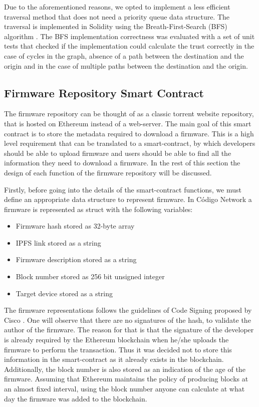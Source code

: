 {{{Due to the aforementioned reasons, we opted to implement a less efficient traversal method that does not need a priority queue data structure. The traversal is implemented in Solidity using the Breath-First-Search (BFS) algorithm \cite{algos}. The BFS implementation correctness was evaluated with a set of unit tests that checked if the implementation could calculate the trust correctly in the case of cycles in the graph, absence of a path between the destination and the origin and in the case of multiple paths between the destination and the origin.
}

\subsection{Firmware Repository Smart Contract}{
The firmware repository can be thought of as a classic torrent website repository, that is hosted on Ethereum instead of a web-server. The main goal of this smart contract is to store the metadata required to download a firmware. This is a high level requirement that can be translated to a smart-contract, by which developers should be able to upload firmware and users should be able to find all the information they need to download a firmware. In the rest of this section the design of each function of the firmware repository will be discussed. 

Firstly, before going into the details of the smart-contract functions, we must define an appropriate data structure to represent firmware. In Código Network a firmware is represented as struct with the following variables:
\begin{itemize}
  \item  Firmware hash stored as 32-byte array
  \item  IPFS link stored as a string
  \item  Firmware description stored as a string
  \item  Block number stored as 256 bit unsigned integer
  \item  Target device stored as a string
\end{itemize}

The firmware representations follows the guidelines of Code Signing proposed by Cisco \cite{fleischman2002code}. One will observe that there are no signatures of the hash, to validate the author of the firmware. The reason for that is that the signature of the developer is already required by the Ethereum blockchain when he/she uploads the firmware to perform the transaction. Thus it was decided not to store this information in the smart-contract as it already exists in the blockchain. Additionally, the block number is also stored as an indication of the age of the firmware. Assuming that Ethereum maintains the policy of producing blocks at an almost fixed interval, using the block number anyone can calculate at what day the firmware was added to the blockchain.

}}}
